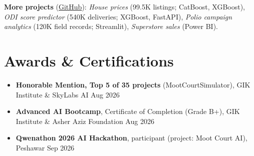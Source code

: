 \documentclass[10pt,a4paper]{article}
\begin{document}
\par\addvspace{2.5pt}\textbf{More projects}
(\href{https://github.com/Shah-123?tab=repositories}{GitHub}):
\textit{House prices} (99.5K listings; CatBoost, XGBoost),
\textit{ODI score predictor} (540K deliveries; XGBoost, FastAPI),
\textit{Polio campaign analytics} (120K field records; Streamlit),
\textit{Superstore sales} (Power BI).

\section{Awards \& Certifications}
\begin{itemize}
  \item \textbf{Honorable Mention, Top 5 of 35 projects} (MootCourtSimulator), GIK Institute \&
        SkyLabs AI \hfill Aug 2026
  \item \textbf{Advanced AI Bootcamp}, Certificate of Completion (Grade B+), GIK Institute \&
        Asher Aziz Foundation \hfill Aug 2026
  \item \textbf{Qwenathon 2026 AI Hackathon}, participant (project: Moot Court AI), Peshawar \hfill Sep 2026
\end{itemize}
\end{document}
